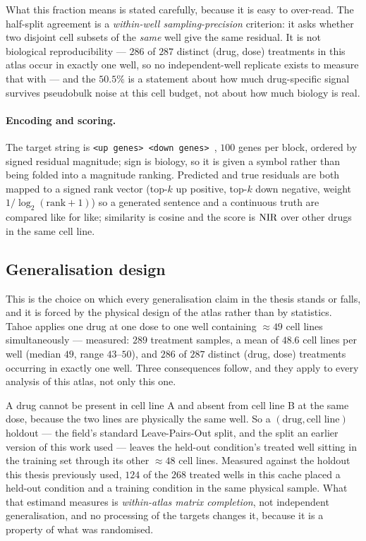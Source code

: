 What this fraction means is stated carefully, because it is easy to over-read. The half-split
agreement is a \emph{within-well sampling-precision} criterion: it asks whether two disjoint cell
subsets of the \emph{same} well give the same residual. It is not biological reproducibility ---
$286$ of $287$ distinct (drug, dose) treatments in this atlas occur in exactly one well, so no
independent-well replicate exists to measure that with --- and the $50.5\%$ is a statement about
how much drug-specific signal survives pseudobulk noise at this cell budget, not about how much
biology is real.

\paragraph{Encoding and scoring.} The target string is
\texttt{<up genes> \DOWN{} <down genes> \ENDCELL}, $100$ genes per block, ordered by signed residual
magnitude; sign is biology, so it is given a symbol rather than being folded into a magnitude
ranking. Predicted and true residuals are both mapped to a signed rank vector (top-$k$ up positive,
top-$k$ down negative, weight $1/\log_2(\textrm{rank}+1)$) so a generated sentence and a continuous
truth are compared like for like; similarity is cosine and the score is $\textrm{NIR}$ over other drugs in
the same cell line.



\subsection{Generalisation design}
\label{sec:methods-holdout}

This is the choice on which every generalisation claim in the thesis stands or falls, and it is
forced by the physical design of the atlas rather than by statistics. Tahoe applies one drug at one
dose to one well containing $\approx 49$ cell lines simultaneously --- measured: $289$ treatment
samples, a mean of $48.6$ cell lines per well (median $49$, range $43$--$50$), and $286$ of $287$
distinct (drug, dose) treatments occurring in exactly one well. Three consequences follow, and they
apply to every analysis of this atlas, not only this one.

A drug cannot be present in cell line A and absent from cell line B at the same dose, because the
two lines are physically the same well. So a $(\textrm{drug}, \textrm{cell line})$ holdout --- the
field's standard Leave-Pairs-Out split, and the split an earlier version of this work used ---
leaves the held-out condition's treated well sitting in the training set through its other
$\approx 48$ cell lines. Measured against the holdout this thesis previously used, $124$ of the
$268$ treated wells in this cache placed a held-out condition and a training condition in the same
physical sample. What that estimand measures is \emph{within-atlas matrix completion}, not
independent generalisation, and no processing of the targets changes it, because it is a property
of what was randomised.

